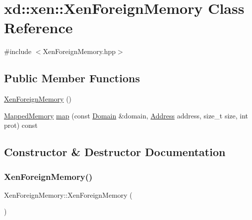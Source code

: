 \hypertarget{classxd_1_1xen_1_1_xen_foreign_memory}{}\section{xd\+:\+:xen\+:\+:Xen\+Foreign\+Memory Class Reference}
\label{classxd_1_1xen_1_1_xen_foreign_memory}


{\ttfamily \#include $<$Xen\+Foreign\+Memory.\+hpp$>$}

\subsection*{Public Member Functions}
\begin{DoxyCompactItemize}
\item 
\mbox{\hyperlink{classxd_1_1xen_1_1_xen_foreign_memory_a33778203b71eff980389bce5f3afa87d}{Xen\+Foreign\+Memory}} ()
\item 
\mbox{\hyperlink{namespacexd_1_1xen_ac9cd783e07e8d847ac0805eec3536746}{Mapped\+Memory}} \mbox{\hyperlink{classxd_1_1xen_1_1_xen_foreign_memory_a2a705269dc085f9052d500dac7fb49b0}{map}} (const \mbox{\hyperlink{classxd_1_1xen_1_1_domain}{Domain}} \&domain, \mbox{\hyperlink{namespacexd_1_1xen_a94a8d6c9448e8330c771c100dba152c3}{Address}} address, size\+\_\+t size, int prot) const
\end{DoxyCompactItemize}


\subsection{Constructor \& Destructor Documentation}
\mbox{\label{classxd_1_1xen_1_1_xen_foreign_memory_a33778203b71eff980389bce5f3afa87d}} 
\subsubsection{\texorpdfstring{Xen\+Foreign\+Memory()}{XenForeignMemory()}}
{\footnotesize\ttfamily Xen\+Foreign\+Memory\+::\+Xen\+Foreign\+Memory (\begin{DoxyParamCaption}{ }\end{DoxyParamCaption})}



